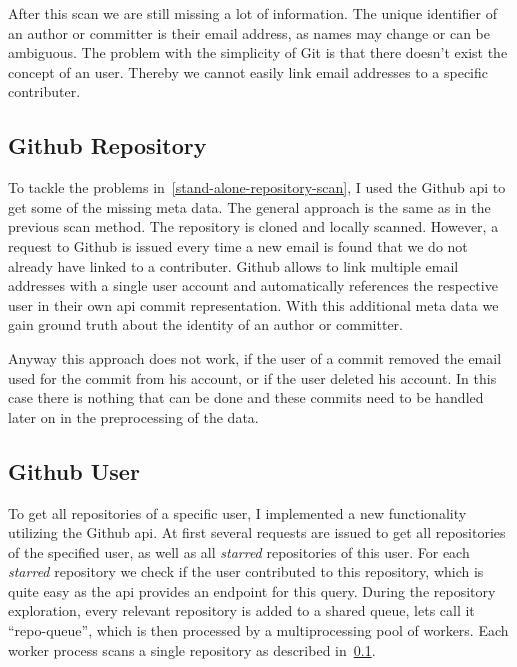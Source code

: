 After this scan we are still missing a lot of information.
The unique identifier of an author or committer is their email address, as names may change or can be ambiguous.
The problem with the simplicity of Git is that there doesn't exist the concept of an user.
Thereby we cannot easily link email addresses to a specific contributer.


\subsection{Github Repository}\label{github-repo-scan}
To tackle the problems in~\ref{stand-alone-repository-scan}, I used the Github \ac{api} to get some of the missing meta data.
The general approach is the same as in the previous scan method. The repository is cloned and locally scanned.
However, a request to Github is issued every time a new email is found that we do not already have linked to a contributer.
Github allows to link multiple email addresses with a single user account and automatically references the respective user in their own \ac{api} commit representation.
With this additional meta data we gain ground truth about the identity of an author or committer.

Anyway this approach does not work, if the user of a commit removed the email used for the commit from his account, or if the user deleted his account.
In this case there is nothing that can be done and these commits need to be handled later on in the preprocessing of the data.


\subsection{Github User}\label{github-user-scan}
To get all repositories of a specific user, I implemented a new functionality utilizing the Github \ac{api}.
At first several requests are issued to get all repositories of the specified user, as well as all \emph{starred} repositories of this user.
For each \emph{starred} repository we check if the user contributed to this repository, which is quite easy as the \ac{api} provides an endpoint for this query.
During the repository exploration, every relevant repository is added to a shared queue, lets call it ``repo-queue'', which is then processed by a multiprocessing pool of workers.
Each worker process scans a single repository as described in~\ref{github-repo-scan}.


